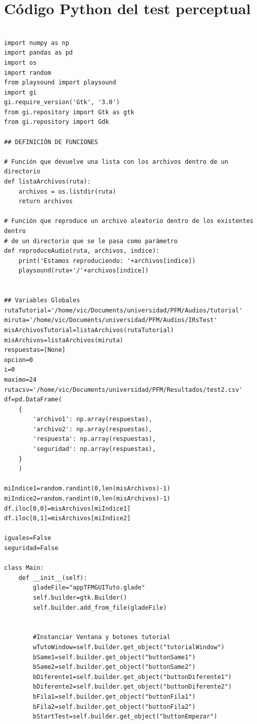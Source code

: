 \documentclass[11pt,a4paper]{book}
\begin{document}
\section{Código Python del test perceptual}
\begin{verbatim}

import numpy as np
import pandas as pd
import os
import random
from playsound import playsound
import gi
gi.require_version('Gtk', '3.0')
from gi.repository import Gtk as gtk
from gi.repository import Gdk

## DEFINICIÓN DE FUNCIONES

# Función que devuelve una lista con los archivos dentro de un directorio
def listaArchivos(ruta):
    archivos = os.listdir(ruta)
    return archivos

# Función que reproduce un archivo aleatorio dentro de los existentes dentro 
# de un directorio que se le pasa como parámetro
def reproduceAudio(ruta, archivos, indice):
    print('Estamos reproduciendo: '+archivos[indice])
    playsound(ruta+'/'+archivos[indice])


## Variables Globales
rutaTutorial='/home/vic/Documents/universidad/PFM/Audios/tutorial'
miruta='/home/vic/Documents/universidad/PFM/Audios/IRsTest'
misArchivosTutorial=listaArchivos(rutaTutorial)
misArchivos=listaArchivos(miruta)
respuestas=[None]
opcion=0
i=0
maximo=24
rutacsv='/home/vic/Documents/universidad/PFM/Resultados/test2.csv'
df=pd.DataFrame(
    {
        'archivo1': np.array(respuestas),
        'archivo2': np.array(respuestas),
        'respuesta': np.array(respuestas),
        'seguridad': np.array(respuestas),
    }
    )

miIndice1=random.randint(0,len(misArchivos)-1)
miIndice2=random.randint(0,len(misArchivos)-1)
df.iloc[0,0]=misArchivos[miIndice1]
df.iloc[0,1]=misArchivos[miIndice2]

iguales=False
seguridad=False

class Main:
    def __init__(self):
        gladeFile="appTFMGUITuto.glade"
        self.builder=gtk.Builder()
        self.builder.add_from_file(gladeFile)


        #Instanciar Ventana y botones tutorial
        wTutoWindow=self.builder.get_object("tutorialWindow")
        bSame1=self.builder.get_object("buttonSame1")
        bSame2=self.builder.get_object("buttonSame2")
        bDiferente1=self.builder.get_object("buttonDiferente1")
        bDiferente2=self.builder.get_object("buttonDiferente2")
        bFila1=self.builder.get_object("buttonFila1")
        bFila2=self.builder.get_object("buttonFila2")
        bStartTest=self.builder.get_object("buttonEmpezar")
        

\end{verbatim}
\end{document}
